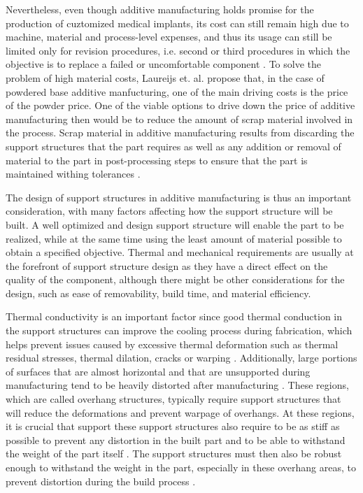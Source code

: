 \documentclass[../main.tex]{subfiles}
\begin{document}
Nevertheless, even though additive manufacturing holds promise for the production of cuztomized medical implants, its cost can still remain high due to machine, material and process-level expenses, and thus its usage can still be limited only for revision procedures, i.e. second or third procedures in which the objective is to replace a failed or uncomfortable component \cite{narraAdditiveManufacturingTotal2019}. To solve the problem of high material costs, Laureijs et. al. propose that, in the case of powdered base additive manfucturing, one of the main driving costs is the price of the powder price. One of the viable options to drive down the price of additive manufacturing then would be to reduce the amount of scrap material involved in the process. Scrap material in additive manufacturing results from discarding the support structures that the part requires as well as any addition or removal of material to the part in post-processing steps to ensure that the part is maintained withing tolerances \cite{MetalAdditiveManufacturing}.

The design of support structures in additive manufacturing is thus an important consideration, with many factors affecting how the support structure will be built. A well optimized and design support structure will enable the part to be realized, while at the same time using the least amount of material possible to obtain a specified objective. Thermal and mechanical requirements are usually at the forefront of support structure design as they have a direct effect on the quality of the component, although there might be other considerations for the design, such as ease of removability, build time, and material efficiency. 

Thermal conductivity is an important factor since good thermal conduction in the support structures can improve the cooling process during fabrication, which helps prevent issues caused by excessive thermal deformation such as thermal residual stresses, thermal dilation, cracks or warping \cite{allaireOptimizingSupportsAdditive2018} \cite{zhouTopologyOptimizationThermal2019}. Additionally, large portions of surfaces that are almost horizontal and that are unsupported during manufacturing tend to be heavily distorted after manufacturing \cite{allaireOptimizingSupportsAdditive2018}. These regions, which are called overhang structures, typically require support structures that will reduce the deformations and prevent warpage of overhangs. At these regions, it is crucial that support  these  support structures also require to be as stiff as possible to prevent any distortion in the built part and to be able to withstand the weight of the part itself \cite{kuoSupportStructureDesign2018}. The support structures must then also be robust enough to withstand the weight in the part, especially in these overhang areas, to prevent distortion during the build process \cite{kumarTailoredSupportStructures2020}.
\end{document}
